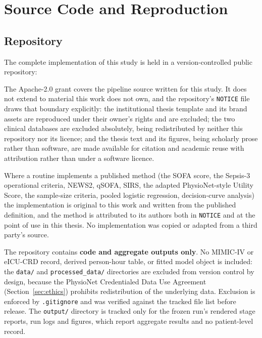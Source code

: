 \chapter{Source Code and Reproduction}
\label{app:code}

\section{Repository}
\label{app:repo}

The complete implementation of this study is held in a version-controlled
public repository:

\begin{center}
\end{center}

The Apache-2.0 grant covers the pipeline source written for this study. It does
not extend to material this work does not own, and the repository's
\texttt{NOTICE} file draws that boundary explicitly: the institutional thesis
template and its brand assets are reproduced under their owner's rights and are
excluded; the two clinical databases are excluded absolutely, being redistributed
by neither this repository nor its licence; and the thesis text and its figures,
being scholarly prose rather than software, are made available for citation and
academic reuse with attribution rather than under a software licence.

Where a routine implements a published method (the SOFA score, the Sepsis-3
operational criteria, NEWS2, qSOFA, SIRS, the adapted PhysioNet-style Utility
Score, the
sample-size criteria, pooled logistic regression, decision-curve analysis) the
implementation is original to this work and written from the published
definition, and the method is attributed to its authors both in \texttt{NOTICE}
and at the point of use in this thesis. No implementation was copied or adapted
from a third party's source.

The repository contains \textbf{code and aggregate outputs only}. No MIMIC-IV
or eICU-CRD record, derived person-hour table, or fitted model object is
included: the \texttt{data/} and \texttt{processed\_data/} directories are
excluded from version control by design, because the PhysioNet Credentialed
Data Use Agreement (Section~\ref{sec:ethics}) prohibits redistribution of the
underlying data. Exclusion is enforced by \texttt{.gitignore} and was verified
against the tracked file list before release. The \texttt{output/} directory
is tracked only for the frozen run's rendered stage reports, run logs and
figures, which report aggregate results and no patient-level record.


